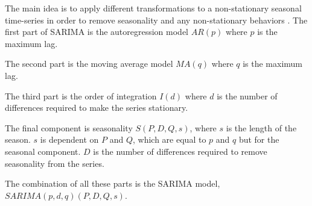 The main idea is to apply different transformations to a non-stationary seasonal time-series
in order to remove seasonality and any non-stationary behaviors
\citep[p. 327-385]{Utlaut2008}.
The first part of SARIMA is the autoregression model
$AR(p)$ where $p$ is the maximum lag.

The second part is the moving average model $MA(q)$ where $q$ is the maximum lag.

The third part is the order of integration $I(d)$ where $d$ is the number of
differences required to make the series stationary.

The final component is seasonality $S(P, D, Q, s)$, where $s$ is the length
of the season.
$s$ is dependent on $P$ and $Q$, which are equal to $p$ and $q$ but for the seasonal component.
$D$ is the number of differences required to remove seasonality from the series.

The combination of all these parts is the SARIMA model,
$SARIMA(p, d, q)(P, D, Q, s)$.
